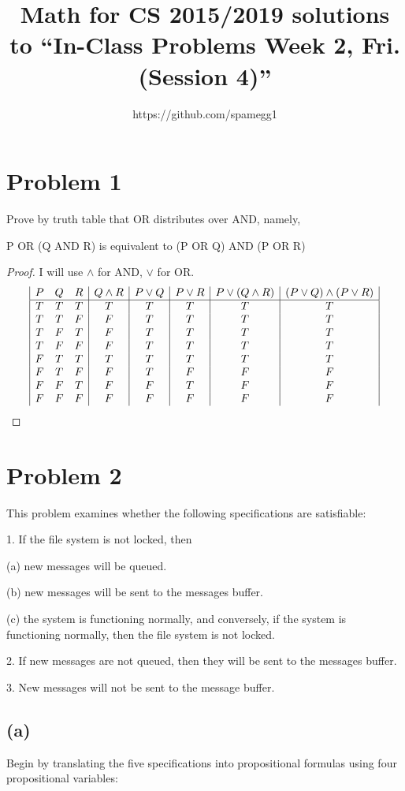 \documentclass[14pt]{extarticle}
\title{Math for CS 2015/2019 solutions to ``In-Class Problems Week 2, Fri. (Session 4)''}
\author{https://github.com/spamegg1}
\begin{document}
\maketitle
\tableofcontents

\section{Problem 1}
Prove by truth table that OR distributes over AND, namely,
\begin{center}
P OR (Q AND R) is equivalent to (P OR Q) AND (P OR R)
\end{center}
\begin{proof}
I will use $\wedge$ for AND, $\vee$ for OR.
$$
\begin{array}{|c c c|c|c|c|c|c|}
P & Q & R & Q \wedge R & P \vee Q & P \vee R & P \vee (Q \wedge R) & (P \vee Q) \wedge (P \vee R) \\ 
\hline 
T & T & T & T & T & T & T & T\\
T & T & F & F & T & T & T & T\\
T & F & T & F & T & T & T & T\\
T & F & F & F & T & T & T & T\\
F & T & T & T & T & T & T & T\\
F & T & F & F & T & F & F & F\\
F & F & T & F & F & T & F & F\\
F & F & F & F & F & F & F & F
\end{array}
$$
\end{proof}

\section{Problem 2}
This problem examines whether the following specifications are satisfiable:

1. If the file system is not locked, then

(a) new messages will be queued.

(b) new messages will be sent to the messages buffer.

(c) the system is functioning normally, and conversely, if the system is functioning normally, then the file system is not locked.

2. If new messages are not queued, then they will be sent to the messages buffer.

3. New messages will not be sent to the message buffer.

\subsection{(a)} 
Begin by translating the five specifications into propositional formulas using four propositional variables:
\end{document}
